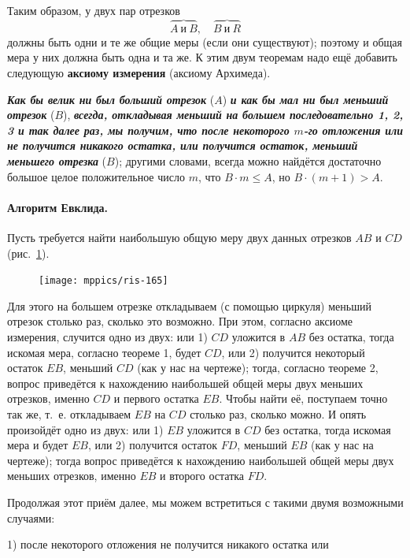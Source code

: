 \documentclass[oneside]{book}
\begin{document}
Таким образом, у двух пар отрезков
\[\overbrace{A\ \text{и}\ B},\quad \overbrace{B\ \text{и}\ R}\]
должны быть одни и те же общие меры (если они существуют);
поэтому и  общая мера у них должна быть одна и та же.
К этим двум теоремам надо ещё добавить следующую \textbf{аксиому измерения} (аксиому Архимеда).

\textbf{\emph{Как бы велик ни был больший отрезок}} ($A$) \textbf{\emph{и как бы мал ни был меньший отрезок}} ($B$), \textbf{\emph{всегда, откладывая меньший на большем последовательно 1, 2, 3 и так далее раз, мы получим, что после некоторого $m$-го отложения или не получится никакого остатка, или получится остаток, меньший меньшего отрезка}} ($B$);
другими словами, всегда можно найдётся достаточно большое целое положительное число $m$, что $B \cdot  m \le A$, но $B \cdot  (m + 1) > A$. %

\paragraph{Алгоритм Евклида.}\label{1938/147}
Пусть требуется найти наибольшую общую меру двух данных отрезков $AB$ и $CD$ (рис.~\ref{1938/ris-165}).

\begin{figure}
\centering
\texttt{[image: mppics/ris-165]}
\caption{}\label{1938/ris-165}
\end{figure}

Для этого на большем отрезке откладываем (с помощью циркуля) меньший отрезок столько раз, сколько это возможно.
При этом, согласно аксиоме измерения, случится одно из двух:
или 
1) $CD$ уложится в $AB$ без остатка, тогда искомая мера, согласно теореме 1, будет $CD$, 
или 2) получится некоторый остаток $EB$, меньший $CD$ (как у нас на чертеже);
тогда, согласно теореме 2, вопрос приведётся к нахождению наибольшей общей меры двух меньших отрезков, именно $CD$ и первого остатка $EB$.
Чтобы найти её, поступаем точно так же, т.~е. откладываем $EB$ на $CD$ столько раз, сколько можно.
И опять произойдёт одно из двух:
или 1) $EB$ уложится в $CD$ без остатка, тогда искомая мера и будет $EB$, 
или 2) получится остаток $FD$, меньший $EB$ (как у нас на чертеже);
тогда вопрос приведётся к нахождению наибольшей общей меры двух меньших отрезков, именно $EB$ и второго остатка $FD$.

Продолжая этот приём далее, мы можем встретиться с такими двумя возможными случаями:

1) после некоторого отложения не получится никакого остатка или
\end{document}
